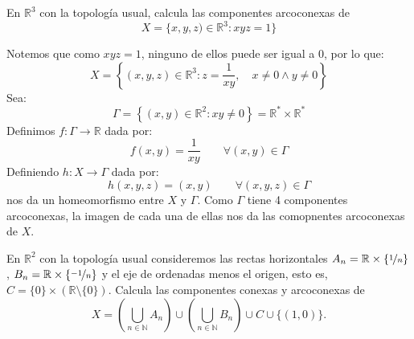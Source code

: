 \begin{ejercicio}
    En $\mathbb{R}^3$ con la topología usual, calcula las componentes arcoconexas de
    \begin{equation*}
        X = \{x,y,z) \in \mathbb{R}^3 : xyz = 1\}
    \end{equation*}

    \noindent
    Notemos que como $xyz = 1$, ninguno de ellos puede ser igual a 0, por lo que:
    \begin{equation*}
        X = \left\{(x,y,z)\in \mathbb{R}^3 : z=\dfrac{1}{xy} ,\quad  x\neq 0 \land y \neq 0\right\}
    \end{equation*}
    Sea:
    \begin{equation*}
        \Gamma = \left\{(x,y) \in \mathbb{R}^2 : xy \neq 0\right\} = \mathbb{R}^\ast \times \mathbb{R}^\ast
    \end{equation*}
    Definimos $f:\Gamma\to \mathbb{R}$ dada por:
    \begin{equation*}
        f(x,y) = \dfrac{1}{xy} \qquad \forall (x,y)\in \Gamma
    \end{equation*}
    Definiendo $h:X\to \Gamma$ dada por:
    \begin{equation*}
        h(x,y,z) = (x,y) \qquad \forall (x,y,z)\in \Gamma
    \end{equation*}
    nos da un homeomorfismo entre $X$ y $\Gamma$. Como $\Gamma$ tiene 4 componentes arcoconexas, la imagen de cada una de ellas nos da las comopnentes arcoconexas de $X$.
\end{ejercicio}

\begin{ejercicio}
    En $\mathbb{R}^2$ con la topología usual consideremos las rectas horizontales $A_n = \mathbb{R}\times \{\nicefrac{1}{n}\}$, $B_n = \mathbb{R}\times \{\nicefrac{-1}{n}\}$ y el eje de ordenadas menos el origen, esto es, $C=\{0\}\times (\mathbb{R}\setminus \{0\})$. Calcula las componentes conexas y arcoconexas de
    \begin{equation*}
        X = \left(\bigcup_{n\in \mathbb{N}}A_n\right) \cup \left(\bigcup_{n\in \mathbb{N}}B_n\right) \cup C \cup \{(1,0)\}.
    \end{equation*}
\end{ejercicio}

